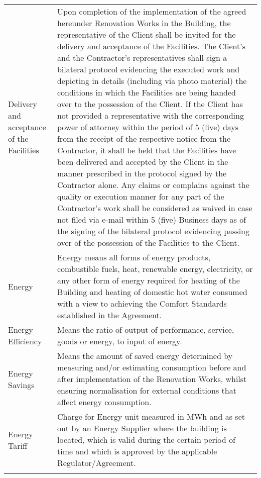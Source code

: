 \documentclass[a4paper]{article}
\begin{document}
\begin{longtabu}{|X|X[2]|}
   \hline

   Delivery and acceptance of the Facilities & Upon completion of the
   implementation of the agreed hereunder Renovation Works in the
   Building, the representative of the Client shall be invited for the
   delivery and acceptance of the Facilities. The Client’s and the
   Contractor’s representatives shall sign a bilateral protocol
   evidencing the executed work and depicting in details (including via
   photo material) the conditions in which the Facilities are being
   handed over to the possession of the Client. If the Client has not
   provided a representative with the corresponding power of attorney
   within the period of 5 (five) days from the receipt of the
   respective notice from the Contractor, it shall be held that the
   Facilities have been delivered and accepted by the Client in the
   manner prescribed in the protocol signed by the Contractor
   alone. Any claims or complains against the quality or execution
   manner for any part of the Contractor’s work shall be considered as
   waived in case not filed via e{-}mail within 5 (five) Business days
   as of the signing of the bilateral protocol evidencing passing over
   of the possession of the Facilities to the Client.\\\tabucline{}

   \hline

   Energy &Energy means all forms of energy products, combustible
   fuels, heat, renewable energy, electricity, or any other form of
   energy required for heating of the Building and heating of domestic
   hot water consumed with a view to achieving the Comfort Standards
   established in the Agreement.\\\tabucline{}

   \hline

   Energy Efficiency &Means the ratio of output of performance,
   service, goods or energy, to input of energy.\\\tabucline{}

   \hline

   Energy Savings &Means the amount of saved energy determined by
   measuring and/or estimating consumption before and after
   implementation of the Renovation Works, whilst ensuring
   normalisation for external conditions that affect energy
   consumption.\\\tabucline{}

   \hline

   Energy Tariff &Charge for Energy unit measured in MWh and as set out
   by an Energy Supplier where the building is located, which is valid
   during the certain period of time and which is approved by the
   applicable Regulator/Agreement.\\\tabucline{}


\end{longtabu}
\end{document}
